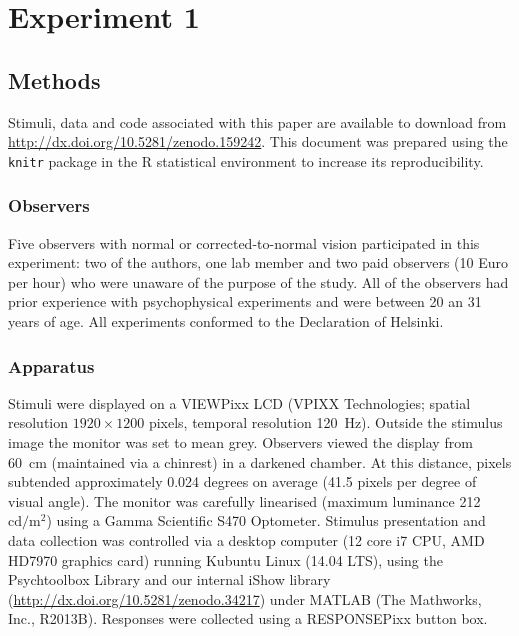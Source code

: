 \documentclass[doc, 11pt,a4paper,natbib]{apa6}\usepackage[]{graphicx}\usepackage[]{color}
\begin{document}
\section{Experiment 1}


\subsection{Methods}

Stimuli, data and code associated with this paper are available to download from \url{http://dx.doi.org/10.5281/zenodo.159242}.
This document was prepared using the \texttt{knitr} package \citep{xie_knitr_2013, xie_dynamic_2015} in the R statistical environment \citep{r_core_development_team_r:_2016,wickham_dplyr:_2016,wickham_ggplot2_2009,wickham_splitapplycombine_2011, auguie_gridextra:_2016, arnold_ggthemes:_2016} to increase its reproducibility.

\subsubsection{Observers}

Five observers with normal or corrected-to-normal vision participated in this experiment: two of the authors, one lab member and two paid observers (10 Euro per hour) who were unaware of the purpose of the study. All of the observers had prior experience with psychophysical experiments and were between 20 an 31 years of age.
All experiments conformed to the Declaration of Helsinki.

\subsubsection{Apparatus}

Stimuli were displayed on a VIEWPixx LCD (VPIXX Technologies; spatial resolution $1920 \times 1200$ pixels, temporal resolution 120~Hz).
Outside the stimulus image the monitor was set to mean grey.
Observers viewed the display from 60~cm (maintained via a chinrest) in a darkened chamber.
At this distance, pixels subtended approximately 0.024 degrees on average (41.5 pixels per degree of visual angle).
The monitor was carefully linearised (maximum luminance 212~$\mathrm{cd}/ \mathrm{m}^2$) using a Gamma Scientific S470 Optometer.
Stimulus presentation and data collection was controlled via a desktop computer (12 core i7 CPU, AMD HD7970 graphics card) running Kubuntu Linux (14.04 LTS), using the Psychtoolbox Library \citep[][version 3.0.11]{kleiner_whats_2007,pelli_videotoolbox_1997,brainard_psychophysics_1997} and our internal iShow library (\url{http://dx.doi.org/10.5281/zenodo.34217}) under MATLAB (The Mathworks, Inc., R2013B).
Responses were collected using a RESPONSEPixx button box.
\end{document}
